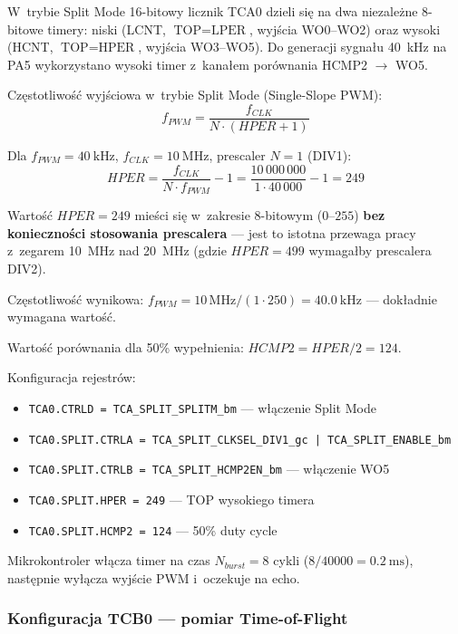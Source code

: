 \documentclass[a4paper,11pt]{article}
\begin{document}
W~trybie Split Mode 16-bitowy licznik TCA0 dzieli się na dwa niezależne
8-bitowe timery: niski (LCNT, $\text{TOP} = \text{LPER}$, wyjścia WO0--WO2)
oraz wysoki (HCNT, $\text{TOP} = \text{HPER}$, wyjścia WO3--WO5).
Do generacji sygnału \SI{40}{\kilo\hertz} na PA5 wykorzystano wysoki timer
z~kanałem porównania HCMP2 $\to$ WO5.

Częstotliwość wyjściowa w~trybie Split Mode (Single-Slope PWM):
\begin{equation}
    f_{PWM} = \frac{f_{CLK}}{N \cdot (HPER + 1)}
    \label{eq:pwm_freq}
\end{equation}

Dla $f_{PWM} = \SI{40}{\kilo\hertz}$, $f_{CLK} = \SI{10}{\mega\hertz}$,
prescaler $N = 1$ (DIV1):
\begin{equation}
    HPER = \frac{f_{CLK}}{N \cdot f_{PWM}} - 1 = \frac{10\,000\,000}{1 \cdot 40\,000} - 1 = 249
    \label{eq:per_value}
\end{equation}

Wartość $HPER = 249$ mieści się w~zakresie 8-bitowym ($0$--$255$)
\textbf{bez konieczności stosowania prescalera} --- jest to istotna
przewaga pracy z~zegarem \SI{10}{\mega\hertz} nad \SI{20}{\mega\hertz}
(gdzie $HPER = 499$ wymagałby prescalera DIV2).

Częstotliwość wynikowa:
$f_{PWM} = 10\,\text{MHz} / (1 \cdot 250) = \SI{40,0}{\kilo\hertz}$ --- dokładnie
wymagana wartość.

Wartość porównania dla 50\% wypełnienia: $HCMP2 = HPER/2 = 124$.

Konfiguracja rejestrów:
\begin{itemize}[nosep]
    \item \texttt{TCA0.CTRLD = TCA\_SPLIT\_SPLITM\_bm} --- włączenie Split Mode
    \item \texttt{TCA0.SPLIT.CTRLA = TCA\_SPLIT\_CLKSEL\_DIV1\_gc | TCA\_SPLIT\_ENABLE\_bm}
    \item \texttt{TCA0.SPLIT.CTRLB = TCA\_SPLIT\_HCMP2EN\_bm} --- włączenie WO5
    \item \texttt{TCA0.SPLIT.HPER = 249} --- TOP wysokiego timera
    \item \texttt{TCA0.SPLIT.HCMP2 = 124} --- 50\% duty cycle
\end{itemize}

Mikrokontroler włącza timer na czas $N_{burst} = 8$ cykli
($8/40000 = \SI{0,2}{\milli\second}$), następnie wyłącza wyjście PWM
i~oczekuje na echo.

\subsubsection{Konfiguracja TCB0 --- pomiar Time-of-Flight}
\end{document}
